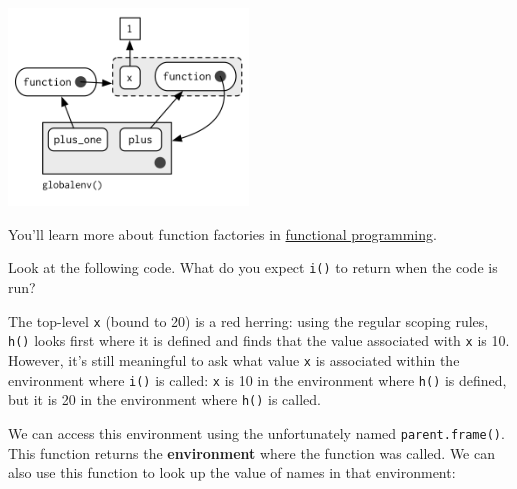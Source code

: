 \includegraphics[width=2.51in]{diagrams/environments.png/closure-2.png}

You'll learn more about function factories in
\hyperref[functional-programming]{functional programming}.


Look at the following code. What do you expect \texttt{i()} to return
when the code is run? 

\begin{Shaded}
\begin{Highlighting}[]
\StringTok{ }
  \StringTok{ }
  \NormalTok{\}}
\NormalTok{\}}
\StringTok{ }\NormalTok{()}
\StringTok{ }
\NormalTok{()}
\end{Highlighting}
\end{Shaded}

The top-level \texttt{x} (bound to 20) is a red herring: using the
regular scoping rules, \texttt{h()} looks first where it is defined and
finds that the value associated with \texttt{x} is 10. However, it's
still meaningful to ask what value \texttt{x} is associated within the
environment where \texttt{i()} is called: \texttt{x} is 10 in the
environment where \texttt{h()} is defined, but it is 20 in the
environment where \texttt{h()} is called.

We can access this environment using the unfortunately named
\texttt{parent.frame()}. This function returns the \textbf{environment}
where the function was called. We can also use this function to look up
the value of names in that environment:

